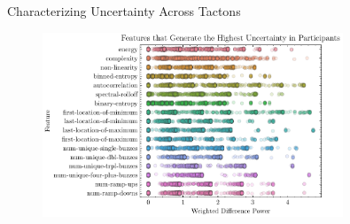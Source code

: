 
\begin{frame}{Characterizing Uncertainty Across Tactons}

\begin{figure}[!htb]
\centering
\includegraphics[width=0.8\textwidth]{Images/IDs_uncertainty.pdf}
\label{fig:ids_uncertainty}
\end{figure}
    
\end{frame}